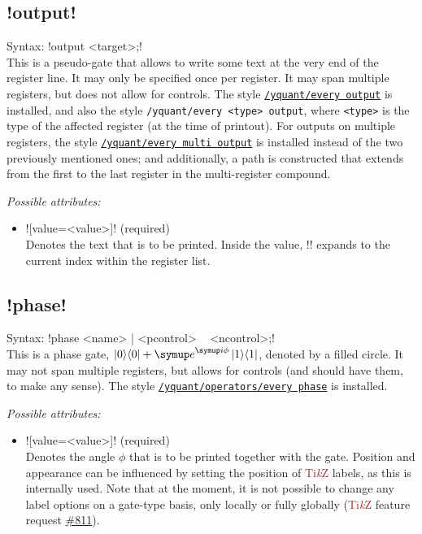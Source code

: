 \documentclass{scrartcl}
\def\TikZ{\textcolor{brown}{Ti\textit kZ}}
\def\style#1{\hyperref[style:#1]{\texttt{#1}}}
\def\ii{{\symup i}}
\def\ee{{\symup e}}
\def\ketbra#1#2{\ket{#1}\!\bra{#2}}
\begin{document}
      \subsection{\texorpdfstring{\yquant!output!}{output}}\label{gate:output}
         Syntax: \yquant!output <target>;! \\
         This is a pseudo\hyp gate that allows to write some text at the very end of the register line.
         It may only be specified once per register.
         It may span multiple registers, but does not allow for controls.
         The style \style{/yquant/every output} is installed, and also the style \texttt{/yquant/every <type> output}, where \texttt{<type>} is the type of the affected register (at the time of printout).
         For outputs on multiple registers, the style \style{/yquant/every multi output} is installed instead of the two previously mentioned ones; and additionally, a path is constructed that extends from the first to the last register in the multi\hyp register compound.
         
         \emph{Possible attributes:}
         \begin{itemize}
            \item \yquant![value=<value>]! (required) \\
               Denotes the text that is to be printed.
               Inside the value, \tex!\idx! expands to the current index within the register list.
         \end{itemize}
      
      \subsection{\texorpdfstring{\yquant!phase!}{phase}}\label{gate:phase}
         Syntax: \yquant!phase <name> | <pcontrol> ~ <ncontrol>;! \\
         This is a phase gate, $\ketbra00 + \ee^{\ii\phi} \ketbra11$, denoted by a filled circle.
         It may not span multiple registers, but allows for controls (and should have them, to make any sense).
         The style \style{/yquant/operators/every phase} is installed.
         
         \emph{Possible attributes:}
         \begin{itemize}
            \item \yquant![value=<value>]! (required) \\
               Denotes the angle $\phi$ that is to be printed together with the gate.
               Position and appearance can be influenced by setting the position of \TikZ{} labels, as this is internally used.
               Note that at the moment, it is not possible to change any label options on a gate\hyp type basis, only locally or fully globally (\TikZ{} feature request \href{https://github.com/pgf-tikz/pgf/issues/811}{\#811}).
         \end{itemize}
         
\end{document}

